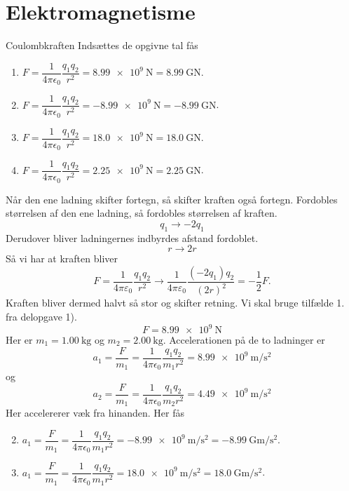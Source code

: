 \documentclass[crop=false, class=memoir]{standalone}
\begin{document}
\chapter{Elektromagnetisme} \label{chap:elektro_facit}

\begin{opgave}{Coulombkraften}
    \opg Indsættes de opgivne tal fås
    \begin{enumerate}
        \item $F = \dfrac{1}{4\pi\epsilon_0}\dfrac{q_1q_2}{r^2} = \SI{8.99e9}{\newton} = \SI{8.99}{\giga\newton}$.
        \item $F = \dfrac{1}{4\pi\epsilon_0}\dfrac{q_1q_2}{r^2} = -\SI{8.99e9}{\newton} = -\SI{8.99}{\giga\newton}$.
        \item $F = \dfrac{1}{4\pi\epsilon_0}\dfrac{q_1q_2}{r^2} = \SI{18.0e9}{\newton} = \SI{18.0}{\giga\newton}$.
        \item $F = \dfrac{1}{4\pi\epsilon_0}\dfrac{q_1q_2}{r^2} = \SI{2.25e9}{\newton} = \SI{2.25}{\giga\newton}$.
    \end{enumerate}
    \[ \]
    \opg Når den ene ladning skifter fortegn, så skifter kraften også fortegn. Fordobles størrelsen af den ene ladning, så fordobles størrelsen af kraften.
    \[ q_1\to -2q_1 \]
    Derudover bliver ladningernes indbyrdes afstand fordoblet.
    \[ r\to 2r\]
    Så vi har at kraften bliver
    \[ F=\frac{1}{4\pi\varepsilon_0}\frac{q_1q_2}{r^2}\to\frac{1}{4\pi\varepsilon_0}\frac{(-2q_1)q_2}{(2r)^2}=-\frac{1}{2}F.\]
    Kraften bliver dermed halvt så stor og skifter retning.
    \opg Vi skal bruge tilfælde 1. fra delopgave 1).
    \[ F=\SI{8.99e9}{\newton} \]
    Her er $m_1=\SI{1.00}{\kilo\gram}$ og $m_2=\SI{2.00}{\kilo\gram}$.
    Accelerationen på de to ladninger er
    \[ a_1 = \dfrac{F}{m_1} = \dfrac{1}{4\pi\epsilon_0}\dfrac{q_1q_2}{m_1r^2} = \SI{8.99e9}{\metre\per\second\squared} \]
    og
    \[ a_2 = \dfrac{F}{m_1} = \dfrac{1}{4\pi\epsilon_0}\dfrac{q_1q_2}{m_2r^2} = \SI{4.49e9}{\metre\per\second\squared}\]
    Her accelererer væk fra hinanden.
    \opg Her fås
    \begin{enumerate}
        \setcounter{enumi}{1}
        \item $a_1 = \dfrac{F}{m_1} = \dfrac{1}{4\pi\epsilon_0}\dfrac{q_1q_2}{m_1r^2} = -\SI{8.99e9}{\metre\per\second\squared} = -\SI{8.99}{\giga\metre\per\second\squared}$.
        \item $a_1 = \dfrac{F}{m_1} = \dfrac{1}{4\pi\epsilon_0}\dfrac{q_1q_2}{m_1r^2} = \SI{18.0e9}{\metre\per\second\squared} = \SI{18.0}{\giga\metre\per\second\squared}$.

\end{enumerate}
\end{opgave}
\end{document}
